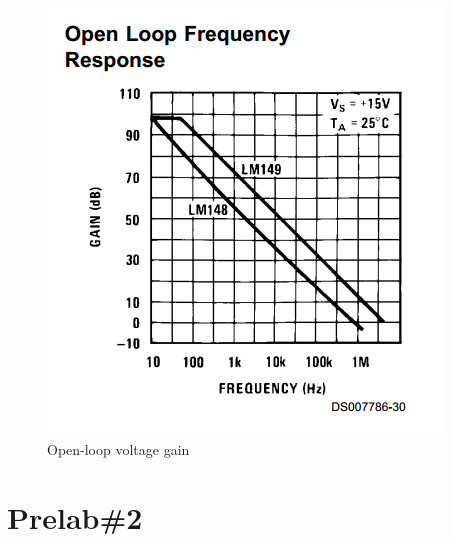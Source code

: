 \documentclass{IEEEtran}
\begin{document}
	\begin{figure}[!htbp]
		\centering
		\begin{framed}
			\includegraphics[width=\linewidth]{images/1_2.PNG}
			\caption{Open-loop voltage gain}
		\end{framed}
		\label{fig:102}
	\end{figure}
	\section{\textbf{Prelab\#2}}
\end{document}

